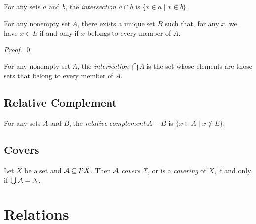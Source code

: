 \begin{definition}
    For any sets $a$ and $b$, the \emph{intersection} $a \cap b$ is $\{ x \in a \mid x \in b \}$.
\end{definition}

\begin{theorem}
    For any nonempty set $A$, there exists a unique set $B$ such that, for any $x$, we have $x \in B$ if and only if $x$ belongs to every member of $A$.
\end{theorem}

\begin{proof}
    \pf
    \qed
\end{proof}

\begin{definition}
    For any nonempty set $A$, the \emph{intersection} $\bigcap A$ is the set whose elements are those sets that belong to every member of $A$.
\end{definition}

\section{Relative Complement}

\begin{definition}
    For any sets $A$ and $B$, the \emph{relative complement} $A - B$ is $\{ x \in A \mid x \notin B \}$.
\end{definition}

\section{Covers}

\begin{definition}[Cover]
    Let $X$ be a set and $\AA \subseteq \pow X$. Then $\AA$ \emph{covers} $X$,
    or is a \emph{covering} of $X$, if and only if $\bigcup \AA = X$.
\end{definition}

\chapter{Relations}

